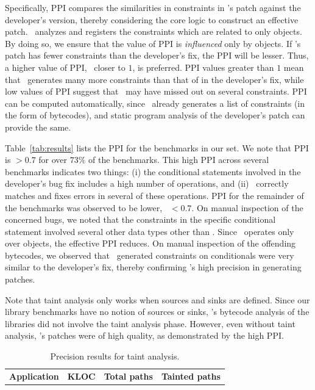 \begin{mylist}
Specifically, PPI compares the similarities in constraints in \tool's patch
against the developer's version, thereby considering the core logic to construct
an effective patch. \tool\ analyzes and registers the constraints which are
related to only  objects. By doing so, we ensure that the value of
PPI is \emph{influenced} only by  objects.
 If \tool's patch has fewer constraints than the developer's
fix, the PPI will be lesser. Thus, a higher value of PPI, \ie\ closer to $1$, is
preferred. PPI values greater than $1$ mean that \tool\ generates many more
constraints than that of in the developer's fix, while low values of PPI
suggest that \tool\ may have missed out on several constraints. PPI can be
computed automatically, since \tool\ already generates a list of constraints (in
the form of bytecodes), and static program analysis of the developer's patch can
provide the same.

Table~\ref{tab:results} lists the PPI for the benchmarks in our set. We note
that PPI is $>0.7$ for over $73\%$ of the benchmarks. This high PPI across
several benchmarks indicates two things: (i) the conditional statements involved
in the developer's bug fix includes a high number of  operations,
and (ii) \tool\ correctly matches and fixes errors in several of these
 operations. PPI for the remainder of the benchmarks was observed
to be lower, \ie\ $<0.7$. On manual inspection of the concerned bugs, we noted
that the constraints in the specific conditional statement involved several
other data types other than . Since \tool\ operates only over
 objects, the effective PPI reduces. On manual inspection of the
offending bytecodes, we observed that \tool\ generated constraints on
 conditionals were very similar to the developer's fix, thereby
confirming \tool's high precision in generating patches.

Note that taint analysis only works when sources and sinks are defined.
Since our library benchmarks have no notion of sources or sinks, \tool's
bytecode analysis of the libraries did not involve the taint analysis phase.
However, even without taint analysis, \tool's patches were of high quality, as
demonstrated by the high PPI.

\begin{table}[t]
\centering
\caption{Precision results for taint analysis.}
\scriptsize
\begin{tabular}{|l|r|r|r|}
\hline
\multicolumn{1}{|c|}{\textbf{Application}} &
\multicolumn{1}{c|}{\textbf{KLOC}} &
\multicolumn{1}{c|}{\textbf{Total paths}} &
\multicolumn{1}{c|}{\textbf{Tainted paths}}\\


\end{tabular}
\end{table}
\end{mylist}
